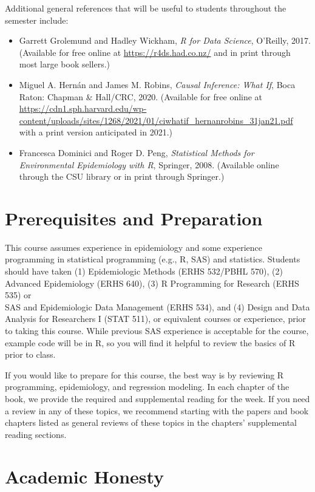 \documentclass[
]{book}
\providecommand{\tightlist}{%
  \setlength{\itemsep}{0pt}\setlength{\parskip}{0pt}}
\begin{document}
Additional general references that will be useful
to students throughout the semester include:

\begin{itemize}
\tightlist
\item
  Garrett Grolemund and Hadley Wickham, \emph{R for Data Science}, O'Reilly, 2017. (Available for free online at \url{https://r4ds.had.co.nz/} and in print through
  most large book sellers.)
\item
  Miguel A. Hernán and James M. Robins, \emph{Causal Inference: What If}, Boca Raton: Chapman \& Hall/CRC, 2020. (Available for free online at \url{https://cdn1.sph.harvard.edu/wp-content/uploads/sites/1268/2021/01/ciwhatif_hernanrobins_31jan21.pdf} with a print version anticipated in 2021.)
\item
  Francesca Dominici and Roger D. Peng, \emph{Statistical Methods for Environmental Epidemiology with R}, Springer, 2008. (Available online through the CSU library or in print through Springer.)
\end{itemize}

\section{Prerequisites and Preparation}\label{prerequisites-and-preparation}

This course assumes experience in epidemiology and some experience
programming in statistical programming (e.g., R, SAS) and statistics.
Students should have taken (1) Epidemiologic Methods (ERHS 532/PBHL 570),
(2) Advanced Epidemiology (ERHS 640),
(3) R Programming for Research (ERHS 535) or\\
SAS and Epidemiologic Data Management (ERHS 534),
and (4) Design and Data Analysis for Researchers I (STAT 511),
or equivalent courses or experience, prior
to taking this course. While previous SAS experience is acceptable for the
course, example code will be in R, so you will find it helpful to review the basics of R
prior to class.

If you would like to prepare for this course, the best way is by reviewing
R programming, epidemiology, and regression modeling. In each chapter of the book,
we provide the required and supplemental reading for the week. If you need a review
in any of these topics, we recommend starting with the papers and book chapters
listed as general reviews of these topics in the chapters' supplemental reading
sections.

\section{Academic Honesty}\label{academic-honesty}
\end{document}
